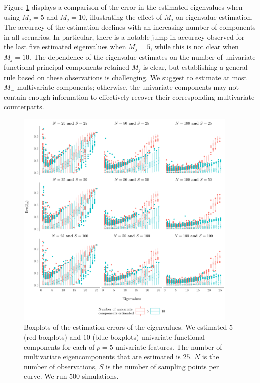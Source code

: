 Figure \ref{fig:ncomp} displays a comparison of the error in the estimated eigenvalues when using $M_j = 5$ and $M_j = 10$, illustrating the effect of $M_j$ on eigenvalue estimation. The accuracy of the estimation declines with an increasing number of components in all scenarios. In particular, there is a notable jump in accuracy observed for the last five estimated eigenvalues when $M_j = 5$, while this is not clear when $M_j = 10$. The dependence of the eigenvalue estimates on the number of univariate functional principal components retained $M_j$ is clear, but establishing a general rule based on these observations is challenging. We suggest to estimate at most $M_{-}$ multivariate components; otherwise, the univariate components may not contain enough information to effectively recover their corresponding multivariate counterparts.
\begin{figure}
     \centering
    \includegraphics[width=0.95\textwidth]{figures/ncomp.pdf}
    \caption{Boxplots of the estimation errors of the eigenvalues. We estimated $5$ (red boxplots) and $10$ (blue boxplots) univariate functional components for each of $p = 5$ univariate features. The number of multivariate eigencomponents that are estimated is $25$. $N$ is the number of observations, $S$ is the number of sampling points per curve. We run $500$ simulations.}
    \label{fig:ncomp}
\end{figure}
